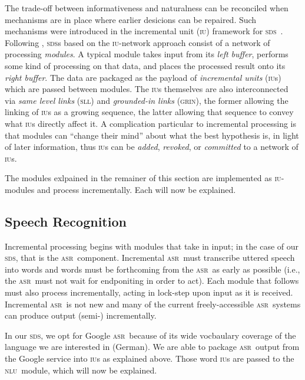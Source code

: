 \documentclass[11pt]{article}
\newcommand{\sds}[0]{\textsc{sds}}
\newcommand{\nlu}[0]{\textsc{nlu}}
\newcommand{\asr}[0]{\textsc{asr}}
\newcommand{\iu}[0]{\textsc{iu}}
\begin{document}
The trade-off between informativeness and naturalness can be reconciled when mechanisms are in place where earlier desicions can be repaired. Such mechanisms were introduced in the incremental unit (\iu) framework for \sds\ \cite{Schlangen2009,Schlangen2011}. Following \cite{kennington-kousidis-schlangen:2014:W14-43}, \sds s based on the \iu-network approach consist of a network of processing \emph{modules}. A typical module takes input from its \emph{left buffer}, performs some kind of processing on that data, and places the processed result onto its \emph{right buffer}. The data are packaged as the payload of \emph{incremental units} (\textsc{iu}s) which are passed between modules. The \textsc{iu}s themselves are also interconnected via  \emph{same level links} (\textsc{sll}) and \emph{grounded-in links} (\textsc{grin}), the former allowing the linking of \textsc{iu}s as a growing sequence, the latter allowing that sequence to convey what \textsc{iu}s directly affect it.  A complication particular to incremental processing is that modules can ``change their mind'' about what the best hypothesis is, in light of later information, thus \textsc{iu}s can be \emph{added}, \emph{revoked}, or \emph{committed} to a network of \textsc{iu}s.

The modules exlpained in the remainer of this section are implemented as \iu-modules and process incrementally. Each will now be explained. 

\subsection{Speech Recognition}

Incremental processing begins with modules that take in input; in the case of our \sds, that is the \asr\ component. Incremental \asr\ must transcribe uttered speech into words and words must be forthcoming from the \asr\ as early as possible (i.e., the \asr\ must not wait for endponiting in order to act). Each module that follows must also process incrementally, acting in lock-step upon input as it is received. Incremental \asr\ is not new \cite{baumannetal2009:naacl} and many of the current freely-accessible \asr\ systems can produce output (semi-) incrementally. 

In our \sds, we opt for Google \asr\ because of its wide vocbaulary coverage of the language we are interested in (German). We are able to package \asr\ output from the Google service into \iu s as explained above. Those word \iu s are passed to the \nlu\ module, which will now be explained. 
\end{document}
